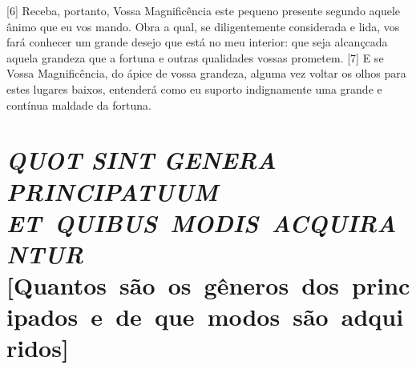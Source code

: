 {[}6{]} Receba, portanto, Vossa Magnificência este pequeno presente
segundo aquele ânimo que eu vos mando. Obra a qual, se diligentemente
considerada e lida, vos fará conhecer um grande desejo que está no meu
interior: que seja alcançcada aquela grandeza que a fortuna e outras
qualidades vossas prometem. {[}7{]} E se Vossa Magnificência, do ápice
de vossa grandeza, alguma vez voltar os olhos para estes lugares baixos,
entenderá como eu suporto indignamente uma grande e contínua maldade da
fortuna.

\setcounter{secnumdepth}{2}

\quebra\section{\emph{QUOT SINT GENERA PRINCIPATUUM ET~QUIBUS~MODIS~ACQUIRANTUR} {[}Quantos~são~os~gêneros~dos~principados~e~de~que~modos~são~adquiridos{]}}


